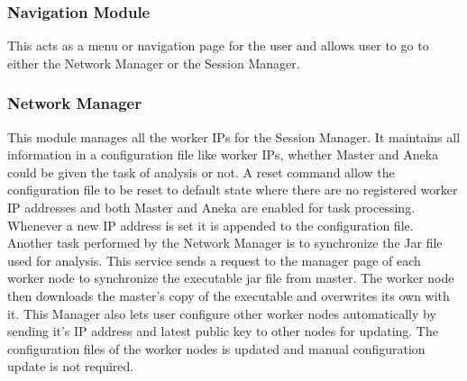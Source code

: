 \documentclass[10pt,journal,compsoc]{IEEEtran}
\begin{document}
\subsubsection{Navigation Module}
This acts as a menu or navigation page for the user and allows user to go to either the Network Manager or the Session Manager.

\subsubsection{Network Manager}
This module manages all the worker IPs for the Session Manager. It maintains all information in a configuration file like worker IPs, whether Master and Aneka could be given the task of analysis or not. A reset command allow the configuration file to be reset to default state where there are no registered worker IP addresses and both Master and Aneka are enabled for task processing. 
Whenever a new IP address is set it is appended to the configuration file. \\
Another task performed by the Network Manager is to synchronize the Jar file used for analysis. This service sends a request to the manager page of each worker node to synchronize the executable jar file from master. The worker node then downloads the master’s copy of the executable and overwrites its own with it. 
This Manager also lets user configure other worker nodes automatically by sending it’s IP address and latest public key to other nodes for updating. The configuration files of the worker nodes is updated and manual configuration update is not required.
\end{document}
